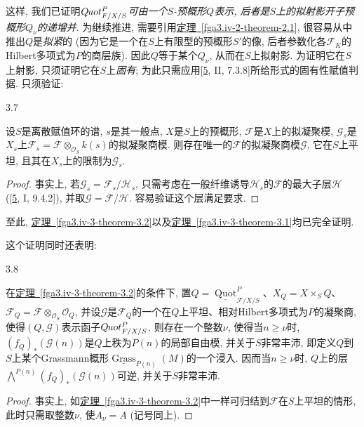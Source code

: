 \par{}这样, 我们已证明\emph{\(\mathscr {Q}\kern  -.75pt\mathit {uot}_{{\mathscr {F}/X/S}}^P\)可由一个\(S\)-预概形\(Q\)表示, 后者是\(S\)上的拟射影开子预概形\(Q_\nu \)的递增并}. 为继续推进, 需要引用\hyperref[fga3.iv-2-theorem-2.1]{定理~\ref*{fga3.iv-2-theorem-2.1}}, 很容易从中推出\(Q\)是\emph{拟紧}的 (因为它是一个在\(S\)上有限型的预概形\(S'\)的像, 后者参数化各\(\mathscr {F}_K\)的Hilbert多项式为\(P\)的商层族). 因此\(Q\)等于某个\(Q_\nu \), 从而在\(S\)上拟射影. 为证明它在\(S\)上射影, 只须证明它在\(S\)上\emph{固有}; 为此只需应用[\hyperref[GD1960]{5}, II, 7.3.8]所给形式的固有性赋值判据. 只须验证:
\begin{lemma}{3.7}\label{fga3.iv-3-lemma-3.7}\skipsinglepar
\par{}设\(S\)是离散赋值环的谱, \(s\)是其一般点, \(X\)是\(S\)上的预概形, \(\mathscr {F}\)是\(X\)上的拟凝聚模, \(\mathscr {G}_s\)是\(X_s\)上\(\mathscr {F}_s=\mathscr {F}\otimes _{\mathcal {O}_S} k(s)\)的拟凝聚商模. 则存在唯一的\(\mathscr {F}\)的拟凝聚商模\(\mathscr {G}\), 它在\(S\)上平坦, 且其在\(X_s\)上的限制为\(\mathscr {G}_s\).
\begin{proof}
\par{}事实上, 若\(\mathscr {G}_s=\mathscr {F}_s/\mathscr {H}_s\), 只需考虑在一般纤维诱导\(\mathscr {H}_s\)的\(\mathscr {F}\)的最大子层\(\mathscr {H}\) ([\hyperref[GD1960]{5}, I, 9.4.2]), 并取\(\mathscr {G}=\mathscr {F}/\mathscr {H}\). 容易验证这个层满足要求.
\end{proof}
\end{lemma}
\par{}至此, \hyperref[fga3.iv-3-theorem-3.2]{定理~\ref*{fga3.iv-3-theorem-3.2}}以及\hyperref[fga3.iv-3-theorem-3.1]{定理~\ref*{fga3.iv-3-theorem-3.1}}均已完全证明.
\par{}这个证明同时还表明:
\begin{proposition}{3.8}\label{fga3.iv-3-proposition-3.8}\skipsinglepar
\par{}在\hyperref[fga3.iv-3-theorem-3.2]{定理~\ref*{fga3.iv-3-theorem-3.2}}的条件下, 置\(Q=\underline {\operatorname {Quot}}_{{\mathscr {F}/X/S}}^P\)、\(X_Q=X\times _S Q\)、\(\mathscr {F}_Q=\mathscr {F}\otimes _{\mathcal {O}_S}\mathcal {O}_Q\), 并设\(\mathscr {G}\)是\(\mathscr {F}_Q\)的一个在\(Q\)上平坦、相对Hilbert多项式为\(P\)的凝聚商, 使得\((Q,\mathscr {G})\)表示函子\(\mathscr {Q}\kern  -.75pt\mathit {uot}_{{\mathscr {F}/X/S}}^P\). 则存在一个整数\(\nu \), 使得当\(n\geqslant \nu \)时, \((f_Q)_*(\mathscr {G} (n))\)是\(Q\)上秩为\(P(n)\)的局部自由模, 并关于\(S\)非常丰沛, 即定义\(Q\)到\(S\)上某个Grassmann概形\(\underline {\operatorname {Grass}}_{P(n)} (M)\)的一个浸入. 因而当\(n\geqslant \nu \)时, \(Q\)上的层\(\bigwedge ^{P(n)} (f_Q)_*(\mathscr {G} (n))\)可逆, 并关于\(S\)非常丰沛.
\begin{proof}
\par{}事实上, 如\hyperref[fga3.iv-3-theorem-3.2]{定理~\ref*{fga3.iv-3-theorem-3.2}}中一样可归结到\(\mathscr {F}\)在\(S\)上平坦的情形, 此时只需取整数\(\nu \), 使\(A_\nu =A\) (记号同上).
\end{proof}
\end{proposition}
